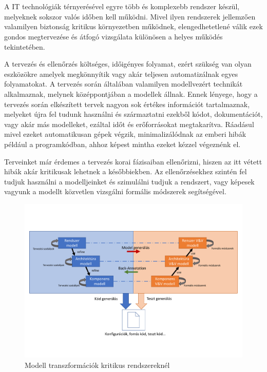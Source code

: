 \chapter{\bevezetes}

A IT technológiák térnyerésével egyre több és komplexebb rendszer készül, melyeknek sokszor valós időben kell működni. Mivel ilyen rendszerek jellemzően valamilyen biztonság kritikus környezetben működnek, elengedhetetlené válik ezek gondos megtervezése és átfogó vizsgálata különösen a helyes működés tekintetében.

A tervezés és ellenőrzés költséges, időigényes folyamat, ezért szükség van olyan eszközökre amelyek megkönnyítik vagy akár teljesen automatizálnak egyes folyamatokat. A tervezés során általában valamilyen modellvezért technikát alkalmaznak, melynek középpontjában a modellek állnak. Ennek lényege, hogy a tervezés során elkészített tervek nagyon sok értékes információt tartalmaznak, melyeket újra fel tudunk használni és származtatni ezekből kódot, dokumentációt, vagy akár más modelleket, ezáltal időt és erőforrásokat megtakarítva. Ráadásul mivel ezeket automatikusan gépek végzik, minimalizálódnak az emberi hibák például a programkódban, ahhoz képest mintha ezeket kézzel végeznénk el.

Terveinket már érdemes a tervezés korai fázisaiban ellenőrizni, hiszen az itt vétett hibák akár kritikusak lehetnek a későbbiekben. Az ellenőrzésekhez szintén fel tudjuk használni a modelljeinket és szimulálni tudjuk a rendszert, vagy képesek vagyunk a modellt közvetlen vizsgálni formális módszerek segítségével.

\begin{figure}[!ht]
	\centering
	\includegraphics[width=120mm,keepaspectratio]{figures/Vmodel.pdf}
	\caption{Modell transzformációk kritikus rendszereknél}
	\label{fig:TeXstudio}
\end{figure}
